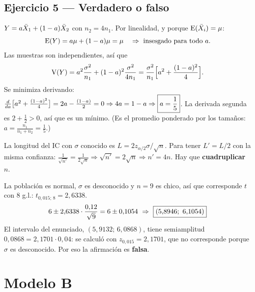 \subsection{Ejercicio 5 --- Verdadero o falso}
$Y=a\bar{X}_1+(1-a)\bar{X}_2$ con $n_2=4n_1$. Por linealidad, y porque $\mathrm{E}(\bar{X}_i)=\mu$:
\[
\E(Y)=a\mu+(1-a)\mu=\mu\quad\Rightarrow\ \text{insesgado para todo }a.
\]
Las muestras son independientes, así que
\[
\mathrm{V}(Y)=a^2\frac{\sigma^2}{n_1}+(1-a)^2\frac{\sigma^2}{4n_1}=\frac{\sigma^2}{n_1}\Big[a^2+\frac{(1-a)^2}{4}\Big].
\]
Se minimiza derivando: $\frac{d}{da}\big[a^2+\frac{(1-a)^2}4\big]=2a-\frac{(1-a)}{2}=0\Rightarrow4a=1-a\Rightarrow\boxed{a=\frac15}$. La derivada segunda es $2+\frac12>0$, así que es un mínimo.
(Es el promedio ponderado por los tamaños: $a=\frac{n_1}{n_1+n_2}=\frac15$.)

La longitud del IC con $\sigma$ conocido es $L=2z_{\alpha/2}\sigma/\sqrt n$. Para tener $L'=L/2$ con la misma confianza: $\frac{1}{\sqrt{n'}}=\frac{1}{2\sqrt n}\Rightarrow\sqrt{n'}=2\sqrt n\Rightarrow n'=4n$. Hay que \textbf{cuadruplicar} $n$.

La población es normal, $\sigma$ es desconocido y $n=9$ es chico, así que corresponde $t$ con 8 g.l.: $t_{0,015;\,8}=2{,}6338$.
\[
6\pm2{,}6338\cdot\frac{0{,}12}{\sqrt9}=6\pm0{,}1054\ \Rightarrow\ \res{(5{,}8946;\ 6{,}1054)}
\]
El intervalo del enunciado, $(5{,}9132;\,6{,}0868)$, tiene semiamplitud $0{,}0868=2{,}1701\cdot0{,}04$: se calculó con $z_{0,015}=2{,}1701$, que no corresponde porque $\sigma$ es desconocido. Por eso la afirmación es \textbf{falsa}.

\newpage
\section{Modelo B}

